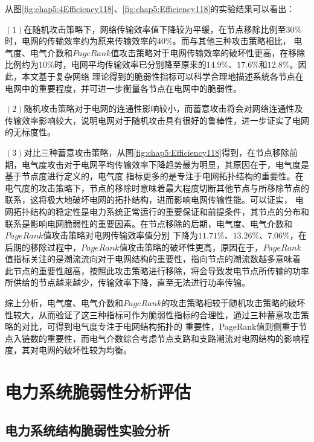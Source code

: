 从图\ref{fig:chap5:4Efficiency118}、\ref{fig:chap5:Efficiency118}的实验结果可以看出：

$(1)$在随机攻击策略下，网络传输效率值下降较为平缓，在节点移除比例至$30\%$时，电网的传输效率约为原来传输效率的$40\%$。而与其他三种攻击策略相比，
电气度、电气介数和$PageRank$值攻击策略对于电网传输效率的破坏性更高，在移除比例约为$10\%$时，电网平均传输效率已分别降至原来的$14.9\%$、$17.6\%$和$12.8\%$。因此，本文基于复杂网络
理论得到的脆弱性指标可以科学合理地描述系统各节点在电网中的重要程度，并可进一步衡量各节点在电网中的脆弱性。

$(2)$随机攻击策略对于电网的连通性影响较小，而蓄意攻击将会对网络连通性及传输效率影响较大，说明电网对于随机攻击具有很好的鲁棒性，进一步证实了电网的无标度性。

$(3)$对比三种蓄意攻击策略，从图\ref{fig:chap5:Efficiency118}得到，在节点移除前期，电气度攻击对于电网平均传输效率下降趋势最为明显，其原因在于，电气度是基于节点度进行定义的，电气度
指标更多的是专注于电网拓扑结构的重要性。在电气度的攻击策略下，节点的移除时意味着最大程度切断其他节点与所移除节点的联系，这将极大地破坏电网的拓扑结构，进而影响电网传输性能。可以证实，
电网拓扑结构的稳定性是电力系统正常运行的重要保证和前提条件，其节点的分布和联系是影响电网脆弱性的重要因素。在节点移除的后期，电气度、电气介数和$PageRank$值攻击策略对电网传输效率值分别
下降为$11.71\%$、$13.26\%$、$7.06\%$，在后期的移除过程中，$PageRank$值攻击策略的破坏性更高，原因在于，$PageRank$值指标关注的是潮流流向对于电网结构的重要性，指向节点的潮流数越多意味着
此节点的重要性越高，按照此攻击策略进行移除，将会导致发电节点所传输的功率所供给的节点越来越少，传输效率下降，直至无法进行功率传输。

综上分析，电气度、电气介数和$PageRank$的攻击策略相较于随机攻击策略的破坏性较大，从而验证了这三种指标可作为脆弱性指标的合理性，通过三种蓄意攻击策略的对比，可得到电气度专注于电网结构拓扑的
重要性，PageRank值则侧重于节点入链数的重要性，而电气介数综合考虑节点支路和支路潮流对电网结构的影响程度，其对电网的破坏性较为均衡。



\section{电力系统脆弱性分析评估}
\label{sec:singleAssessment}




\subsection{电力系统结构脆弱性实验分析}
\label{sec:singleAnalysis_fabric}




